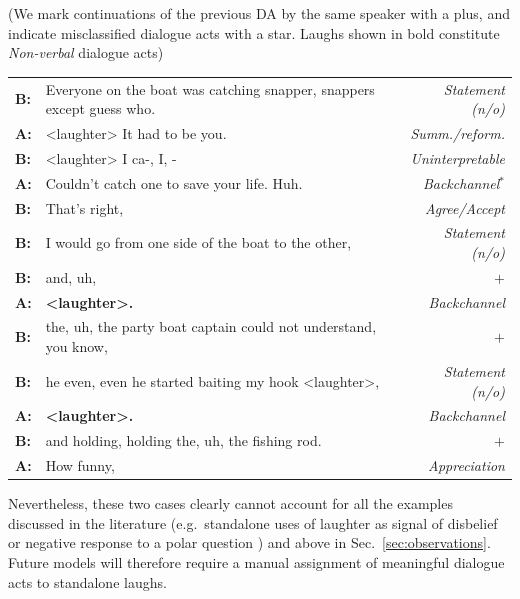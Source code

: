\documentclass[11pt,a4paper]{article}
\begin{document}
\begin{lingex}
  \small
\item\label{ex:fish}  \small
  (We mark continuations of the previous DA by the same speaker with a plus, and indicate misclassified dialogue acts with a star. Laughs shown in bold constitute \emph{Non-verbal} dialogue acts)\\
    \begin{tabulary}{\linewidth}{@{}>{\bf}lJ>{\em}r@{}}
B: & Everyone on the boat was catching snapper, snappers except guess who. & Statement (n/o)  \\ 
A: & <laughter> It had to be you. & Summ./reform.  \\
B: & <laughter> I ca-, I, - & Uninterpretable \\
A: & Couldn't catch one to save your life. Huh. & %
Backchannel$^*$\\
B: & That's right, & Agree/Accept \\
B: & I would go from one side of the boat to the other, & Statement (n/o) \\
B: & and, uh, & $+$ \\
A: & \bf <laughter>. &Backchannel\\
B: & the, uh, the party boat captain could not understand, you know, & $+$ \\
B: & he even, even he started baiting my hook <laughter>, & Statement (n/o) \\
A: & \bf <laughter>. &Backchannel\\
B: & and holding, holding the, uh, the fishing rod. & $+$\\
A: & How funny, & Appreciation \\
\end{tabulary}
\end{lingex}

Nevertheless, these two cases clearly cannot account for all the
examples discussed in the literature (e.g.\ standalone uses of
laughter as signal of disbelief or negative response to a polar
question \citealp{ginzburg2020laughter}) and above in
Sec.~\ref{sec:observations}. Future models will therefore require a
manual assignment of meaningful dialogue acts to standalone laughs.
\end{document}
